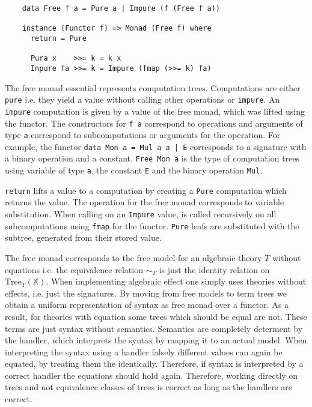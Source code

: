 \begin{verbatim}
    data Free f a = Pure a | Impure (f (Free f a))

    instance (Functor f) => Monad (Free f) where
      return = Pure

      Pura x    >>= k = k x
      Impure fa >>= k = Impure (fmap (>>= k) fa)
\end{verbatim}
The free monad essential represents computation trees.
Computations are either \texttt{pure} i.e. they yield a value without calling
other operations or \texttt{impure}.
An \texttt{impure} computation is given by a value of the free monad, which was
lifted using the functor.
The constructors for \texttt{f a} correspond to operations and arguments of type
\texttt{a} correspond to subcomputations or arguments for the operation.
For example, the functor \texttt{data Mon a = Mul a a | E}
corresponds to a signature with a binary operation and a constant.
\texttt{Free Mon a} is the type of computation trees using variable
of type \texttt{a}, the constant \texttt{E} and the binary operation
\texttt{Mul}.

\texttt{return} lifts a value to a computation by creating a
\texttt{Pure} computation which returns the value.
The \bind{} operation for the free monad corresponds to variable substitution.
When calling \bind{} on an \texttt{Impure} value, \bind{} is called
recursively on all subcomputations using \texttt{fmap} for the
functor.
\texttt{Pure} leafs are substituted with the subtree, generated
from their stored value.

The free monad corresponds to the free model for an algebraic theory $T$ without
equations i.e. the equivalence relation $\sim_T$ is just the identity relation on
$\mathrm{Tree}_T(\mathbb{X})$.
When implementing algebraic effect one simply uses theories without effects,
i.e. just the signatures.
By moving from free models to term trees we obtain a uniform representation of
syntax as free monad over a functor.
As a result, for theories with equation some trees which should be equal are
not.
These terms are just syntax without semantics.
Semantics are completely determent by the handler, which interprets the syntax
by mapping it to an actual model.
When interpreting the syntax using a handler falsely different values can again
be equated, by treating them the identically.
Therefore, if syntax is interpreted by a correct handler the equations should
hold again.
Therefore, working directly on trees and not equivalence classes of trees is
correct as long as the handlers are correct.


